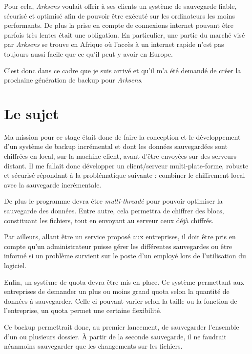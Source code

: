 \documentclass[a4paper,10pt, twoside]{report}
\begin{document}
\begin{spacing}{1.2}
Pour cela, \textit{Arksens} voulait offrir \`a ses clients un syst\`eme de
sauvegarde fiable, s\'ecuris\'e et optimis\'e afin de pouvoir \^etre
ex\'ecut\'e sur les ordinateurs les moins performants. De plus la prise en
compte de connexions internet pouvant \^etre parfois tr\`es lentes \'etait une
obligation. En particulier, une partie du march\'e vis\'e par \textit{Arksens}
se trouve en Afrique o\`u l'acc\`es \`a un internet rapide n'est pas toujours
aussi facile que ce qu'il peut y avoir en Europe.

C'est donc dans ce cadre que je suis arriv\'e et qu'il m'a \'et\'e demand\'e
de cr\'eer la prochaine g\'en\'eration de backup pour \textit{Arksens}.

\section{Le sujet}
Ma mission pour ce stage \'etait donc de faire la conception et le
d\'eveloppement d'un syst\`eme de backup incr\'emental et dont les donn\'ees
sauvegard\'ees sont chiffr\'ees en local, sur la machine client, avant d'\^etre
envoy\'ees sur des serveurs distant. Il me fallait donc d\'evelopper un
client/serveur multi-plate-forme, robuste et s\'ecuris\'e r\'epondant \`a
la probl\'ematique suivante : combiner le chiffrement local avec la sauvegarde
incr\'ementale.

De plus le programme devra \^etre \textit{multi-thread\'e} pour pouvoir
optimiser la sauvegarde des donn\'ees. Entre autre, cela permettra de chiffrer
des blocs, constituant les fichiers, tout en envoyant au serveur ceux d\'ej\`a
chiffr\'es.

Par ailleurs, allant \^etre un service propos\'e aux entreprises, il doit \^etre
pris en compte qu'un administrateur puisse g\'erer les diff\'erentes
sauvegardes ou \^etre inform\'e si un probl\`eme survient sur le poste d'un
employ\'e lors de l'utilisation du logiciel.

Enfin, un syst\`eme de quota devra \^etre mis en place. Ce syst\`eme permettant
aux entreprises de demander un plus ou moins grand quota selon la quantit\'e de
donn\'ees \`a sauvegarder. Celle-ci pouvant varier selon la taille ou la
fonction de l'entreprise, un quota permet une certaine flexibilit\'e.

Ce backup permettrait donc, au premier lancement, de sauvegarder l'ensemble
d'un ou plusieurs dossier. \`A partir de la seconde sauvegarde, il ne faudrait
n\'eanmoins sauvegarder que les changements sur les fichiers.


\end{spacing}
\end{document}
